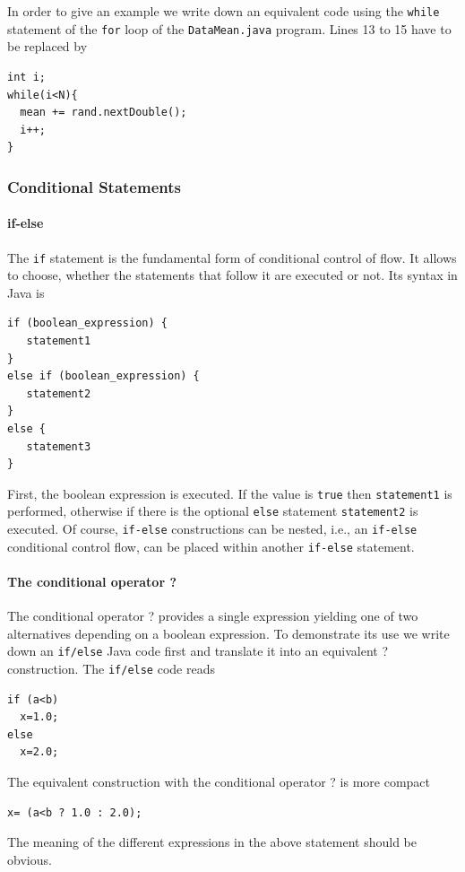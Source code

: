 In order to give an example we write down an equivalent code using
the
\verb|while| statement of the \verb|for| loop of the
\verb|DataMean.java| program. Lines 13 to 15 have to be replaced by
\begin{verbatim}
int i;
while(i<N){
  mean += rand.nextDouble();
  i++;
}
\end{verbatim}

\subsubsection{Conditional Statements}
\paragraph{if-else}
The \verb|if| statement is the fundamental form of conditional control
of flow. It allows to choose, whether the statements that follow it are
executed or not. Its syntax in Java is
\begin{verbatim}
if (boolean_expression) {
   statement1
}
else if (boolean_expression) {
   statement2
}
else {
   statement3
}
\end{verbatim}
First, the boolean expression is executed. If the value is \verb|true|
then \verb|statement1| is performed, otherwise if there is the
optional \verb|else| statement \verb|statement2| is executed. Of
course, \verb|if-else| constructions can be nested, i.e., an
\verb|if-else| conditional control flow, can be placed within another
\verb|if-else| statement.

\paragraph{The conditional operator ?} The conditional operator ?
provides a single expression yielding one of two alternatives depending on
a boolean expression. To demonstrate its use we write down an
\verb|if/else| Java code first and translate it into an equivalent  ? 
construction. The \verb|if/else| code reads

\begin{verbatim}
if (a<b) 
  x=1.0;
else
  x=2.0;
\end{verbatim}
The equivalent construction with the conditional operator ? is more
compact
\begin{verbatim}
x= (a<b ? 1.0 : 2.0);
\end{verbatim}
The meaning of the different expressions in the above statement should
be obvious.


